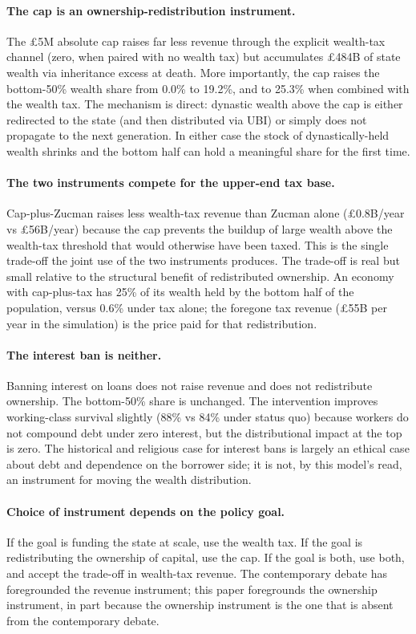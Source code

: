 \documentclass[11pt]{article}
\begin{document}
\paragraph{The cap is an ownership-redistribution instrument.}
The \pounds 5M absolute cap raises far less revenue through the
explicit wealth-tax channel (zero, when paired with no wealth tax)
but accumulates \pounds 484B of state wealth via inheritance
excess at death.  More importantly, the cap raises the bottom-50\%
wealth share from 0.0\% to 19.2\%, and to 25.3\% when combined
with the wealth tax.  The mechanism is direct: dynastic wealth
above the cap is either redirected to the state (and then
distributed via UBI) or simply does not propagate to the next
generation.  In either case the stock of dynastically-held wealth
shrinks and the bottom half can hold a meaningful share for the
first time.

\paragraph{The two instruments compete for the upper-end tax
base.}  Cap-plus-Zucman raises less wealth-tax revenue than Zucman
alone (\pounds 0.8B/year vs \pounds 56B/year) because the cap
prevents the buildup of large wealth above the wealth-tax
threshold that would otherwise have been taxed.  This is the
single trade-off the joint use of the two instruments produces.
The trade-off is real but small relative to the structural
benefit of redistributed ownership.  An economy with cap-plus-tax
has 25\% of its wealth held by the bottom half of the population,
versus 0.6\% under tax alone; the foregone tax revenue (\pounds 55B
per year in the simulation) is the price paid for that
redistribution.

\paragraph{The interest ban is neither.}  Banning interest on
loans does not raise revenue and does not redistribute ownership.
The bottom-50\% share is unchanged.  The intervention improves
working-class survival slightly (88\% vs 84\% under status quo)
because workers do not compound debt under zero interest, but the
distributional impact at the top is zero.  The historical and
religious case for interest bans is largely an ethical case about
debt and dependence on the borrower side; it is not, by this
model's read, an instrument for moving the wealth distribution.

\paragraph{Choice of instrument depends on the policy goal.}  If
the goal is funding the state at scale, use the wealth tax.  If
the goal is redistributing the ownership of capital, use the cap.
If the goal is both, use both, and accept the trade-off in
wealth-tax revenue.  The contemporary debate has foregrounded the
revenue instrument; this paper foregrounds the ownership
instrument, in part because the ownership instrument is the one
that is absent from the contemporary debate.
\end{document}
